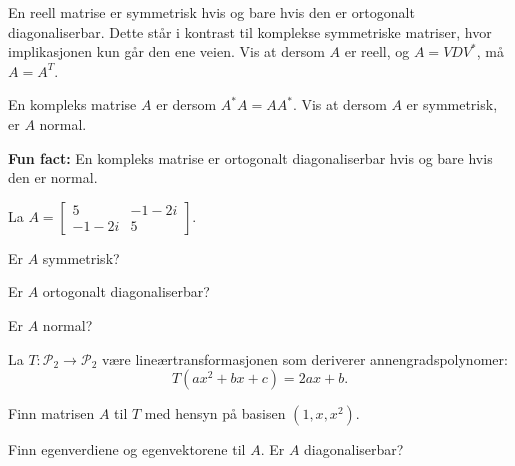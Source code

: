\begin{oppgave}
En reell matrise er symmetrisk hvis og bare hvis den er ortogonalt diagonaliserbar. 
Dette står i kontrast til komplekse symmetriske matriser, hvor implikasjonen kun går den ene veien. 
Vis at dersom $A$ er reell, og $A=VDV^*$, må $A=A^T$.
\end{oppgave}

\begin{oppgave}
En kompleks matrise $A$ er  dersom $A^*A=AA^*$. 
Vis at dersom $A$ er symmetrisk, er $A$ normal. 

\textbf{Fun fact:} En kompleks matrise er ortogonalt diagonaliserbar hvis og bare hvis den er normal.
\end{oppgave}

\begin{oppgave}
La 
$
A=
\begin{bmatrix}
5 &-1-2i \\-1-2i & 5
\end{bmatrix}.
$
\begin{punkt}
Er $A$ symmetrisk?
\end{punkt}
\begin{punkt}
Er $A$ ortogonalt diagonaliserbar? 
\end{punkt}
\begin{punkt}
Er $A$ normal?
\end{punkt}
\end{oppgave}


\begin{oppgave}
La $T:\mathcal{P}_2\rightarrow \mathcal{P}_2$ være lineærtransformasjonen som deriverer annengradspolynomer: $$T(ax^2+bx+c)=2ax+b.$$

\begin{punkt}
Finn matrisen $A$ til $T$ med hensyn på basisen $(1,x,x^2)$.
\end{punkt}

\begin{punkt}
Finn egenverdiene og egenvektorene til $A$. Er $A$ diagonaliserbar?
\end{punkt}

\end{oppgave}

